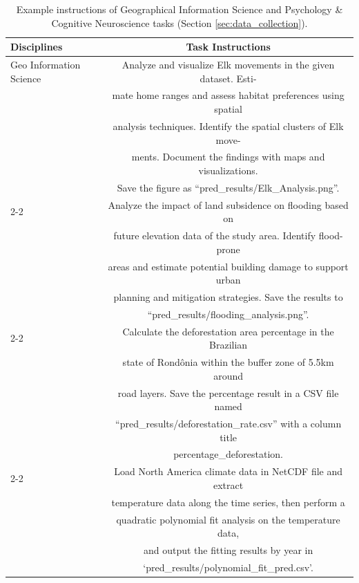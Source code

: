 \newpage

\begin{table}[h]
\small
\centering
\caption{Example instructions of Geographical Information Science and Psychology \& Cognitive Neuroscience tasks (Section \ref{sec:data_collection}).}
\begin{tabular}
{
@{\hspace{0pt}}lc@{\hspace{0pt}}
}
\toprule
\textbf{Disciplines} & \textbf{Task Instructions}\\
\midrule

\multirow{20.5}{*}{Geo Information Science} & Analyze and visualize Elk movements in the given dataset. Esti- \\ 
& mate home ranges and assess habitat preferences using spatial  \\
& analysis techniques. Identify the spatial clusters of Elk move- \\ 
& ments. Document the findings with maps and visualizations.  \\
& Save the figure as ``pred\_results/Elk\_Analysis.png''. \\
\cmidrule{2-2}

& Analyze the impact of land subsidence on flooding based on \\
& future elevation data of the study area. Identify flood-prone \\ 
& areas and estimate potential building damage to support urban \\
& planning and mitigation strategies. Save the results to \\
& ``pred\_results/flooding\_analysis.png''. \\
\cmidrule{2-2}

& Calculate the deforestation area percentage in the Brazilian \\ 
& state of Rondônia within the buffer zone of 5.5km around \\
& road layers. Save the percentage result in a CSV file named \\
& ``pred\_results/deforestation\_rate.csv'' with a column title \\
& percentage\_deforestation. \\
\cmidrule{2-2}

& Load North America climate data in NetCDF file and extract \\
& temperature data along the time series, then perform a \\
& quadratic polynomial fit analysis on the temperature data, \\
& and output the fitting results by year in \\
& `pred\_results/polynomial\_fit\_pred.csv'. \\


\end{tabular}
\end{table}

